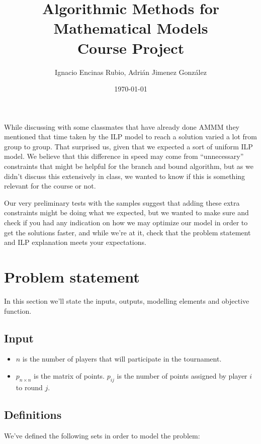 \documentclass[a4paper, 10pt]{article}
\title{Algorithmic Methods for Mathematical Models\\Course Project}
\author{Ignacio Encinas Rubio, Adrián Jimenez González}
\date{\normalsize\today{}}
\begin{document}
\maketitle

\listoftodos[Doubts]

While discussing with some classmates that have already done AMMM they mentioned that time taken by the ILP model to reach a solution varied a lot from group to group. That surprised us,
given that we expected a sort of uniform ILP model. We believe that this difference in speed may come from ``unnecessary'' constraints that might be helpful for the branch and bound algorithm, 
but as we didn't discuss this extensively in class, we wanted to know if this is something relevant for the course or not.

Our very preliminary tests with the samples suggest that adding these extra constraints might be doing what we expected, but we wanted to make sure and check if you had any indication on how we may
optimize our model in order to get the solutions faster, and while we're at it, check that the problem statement and ILP explanation meets your expectations.

\clearpage
\section{Problem statement}
In this section we'll state the inputs, outputs, modelling elements and objective function.


\subsection{Input}
\begin{itemize}
    \item $n$ is the number of players that will participate in the tournament.
    \item $p_{n \times n}$ is the matrix of points. $p_{ij}$ is the number of points assigned by player $i$ to round $j$.
\end{itemize}

\subsection{Definitions}
We've defined the following sets in order to model the problem:
\end{document}
